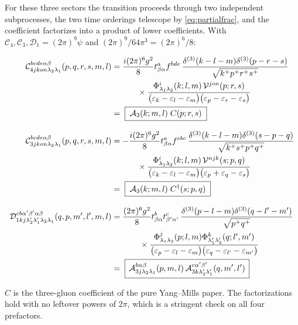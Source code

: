 \documentclass[11pt]{article}
\newcommand{\eps}{\varepsilon}
\newcommand{\dg}{\dagger}
\newcommand{\dthree}{\delta^{(3)}}
\newcommand{\Ph}{\Phi}
\newcommand{\Vg}{\mathcal{V}}
\newcommand{\A}{\mathcal{A}}
\newcommand{\C}{\mathcal{C}}
\newcommand{\D}{\mathcal{D}}
\begin{document}
For these three sectors the transition proceeds through two independent subprocesses, the two
time orderings telescope by \eqref{eq:partialfrac}, and the coefficient factorizes into a product
of lower coefficients. With $\C_{4},\C_{3},\D_{1}=(2\pi)^{9}\psi$ and
$(2\pi)^{9}/64\pi^{3}=(2\pi)^{6}/8$:
\begin{res}
\begin{align}
\C^{bcde\alpha\beta}_{4jkon\lambda_{2}\lambda_{1}}(p,q,r,s,m,l)&=
\frac{i(2\pi)^{6}g^{2}}{8}t^{a}_{\beta\alpha}f^{bde}\,
\frac{\dthree(k-l-m)\dthree(p-r-s)}{\sqrt{k^{+}p^{+}r^{+}s^{+}}}
\nonumber\\&\hspace{1.1cm}\times
\frac{\Ph^{i}_{\lambda_{1}\lambda_{2}}(k;l,m)\,\Vg^{jon}(p;r,s)}
{\big(\eps_{k}-\eps_{l}-\eps_{m}\big)\big(\eps_{p}-\eps_{r}-\eps_{s}\big)}
\nonumber\\
&=\;\boxed{\;\A_{3}(k;m,l)\;C(p;r,s)\;}
\label{eq:C4}\\[8pt]
\C^{bcde\alpha\beta}_{3jkon\lambda_{2}\lambda_{1}}(p,q,r,s,m,l)&=
-\frac{i(2\pi)^{6}g^{2}}{8}t^{a}_{\beta\alpha}f^{ebc}\,
\frac{\dthree(k-l-m)\dthree(s-p-q)}{\sqrt{k^{+}s^{+}p^{+}q^{+}}}
\nonumber\\&\hspace{1.1cm}\times
\frac{\Ph^{i}_{\lambda_{1}\lambda_{2}}(k;l,m)\,\Vg^{njk}(s;p,q)}
{\big(\eps_{k}-\eps_{l}-\eps_{m}\big)\big(\eps_{p}+\eps_{q}-\eps_{s}\big)}
\nonumber\\
&=\;\boxed{\;\A_{3}(k;m,l)\;C^{\dg}(s;p,q)\;}
\label{eq:C3}\\[8pt]
\D^{cb\alpha'\beta'\alpha\beta}_{1kj\lambda_{2}'\lambda_{1}'\lambda_{2}\lambda_{1}}
(q,p,m',l',m,l)&=
\frac{(2\pi)^{6}g^{2}}{8}t^{b}_{\beta\alpha}t^{c}_{\beta'\alpha'}\,
\frac{\dthree(p-l-m)\dthree(q-l'-m')}{\sqrt{p^{+}q^{+}}}
\nonumber\\
&\hspace{1.2cm}\times
\frac{\Ph^{j}_{\lambda_{1}\lambda_{2}}(p;l,m)\Ph^{k}_{\lambda_{1}'\lambda_{2}'}(q;l',m')}
{\big(\eps_{p}-\eps_{l}-\eps_{m}\big)\big(\eps_{q}-\eps_{l'}-\eps_{m'}\big)}
\nonumber\\
&=\;\boxed{\,\A^{b\alpha\beta}_{3j\lambda_{2}\lambda_{1}}(p,m,l)\,
\A^{c\alpha'\beta'}_{3k\lambda_{2}'\lambda_{1}'}(q,m',l')\,}
\label{eq:D1}
\end{align}
\end{res}
\noindent
$C$ is the three-gluon coefficient of the pure Yang--Mills paper. The factorizations hold with no
leftover powers of $2\pi$, which is a stringent check on all four prefactors.
\end{document}
